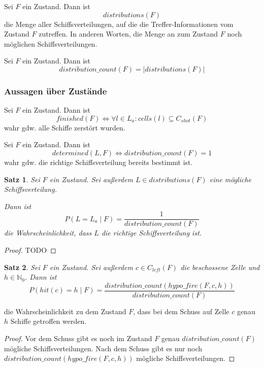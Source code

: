 \documentclass[a4paper,12pt]{llncs}
\newcommand{\N}{{\mathbb{N}}}
\numberwithin{equation}{section}
\newtheorem{satz}{Satz}
\begin{document}
\begin{definition}
Sei $F$ ein Zustand.
Dann ist
\[
distributions(F)
\]
die Menge aller Schiffsverteilungen, auf die die Treffer-Informationen vom Zustand $F$ zutreffen.
In anderen Worten, die Menge an zum Zustand $F$ noch möglichen Schiffsverteilungen.
\end{definition}

\begin{definition}
Sei $F$ ein Zustand.
Dann ist
\[
distribution\_count(F)=|distributions(F)|
\]
\end{definition}

\subsubsection{Aussagen über Zustände}

\begin{definition}
Sei $F$ ein Zustand.
Dann ist
\[
finished(F) \Leftrightarrow \forall l \in L_a \colon cells(l) \subseteq C_{shot}(F)
\]
wahr gdw. alle Schiffe zerstört wurden.
\end{definition}

\begin{definition}
Sei $F$ ein Zustand.
Dann ist
\[
determined(L, F) \Leftrightarrow distribution\_count(F)=1
\]
wahr gdw. die richtige Schiffsverteilung bereits bestimmt ist.
\end{definition}


\begin{satz}
Sei $F$ ein Zustand.
Sei außerdem $L \in distributions(F)$ eine mögliche Schiffsverteilung.

Dann ist
\[
P(L = L_a \mid F)=\frac{1}{distribution\_count(F)}
\]
die Wahrscheinlichkeit, dass $L$ die richtige Schiffsverteilung ist.
\end{satz}

\begin{proof}
TODO
\end{proof}


\begin{satz}
Sei $F$ ein Zustand.
Sei außerdem $c \in C_{left}(F)$ die beschossene Zelle und $h \in \N_0$.
Dann ist
\[
P(hit(c)=h \mid F)=\frac{distribution\_count(hypo\_fire(F,c, h))}{distribution\_count(F)}
\]
\end{satz}
die Wahrscheinlichkeit zu dem Zustand $F$, dass bei dem Schuss auf Zelle $c$ genau $h$ Schiffe getroffen werden.

\begin{proof}
Vor dem Schuss gibt es noch im Zustand $F$ genau $distribution\_count(F)$ mögliche Schiffsverteilungen.
Nach dem Schuss gibt es nur noch $distribution\_count(hypo\_fire(F,c, h))$ mögliche Schiffsverteilungen.
\end{proof}
\end{document}
